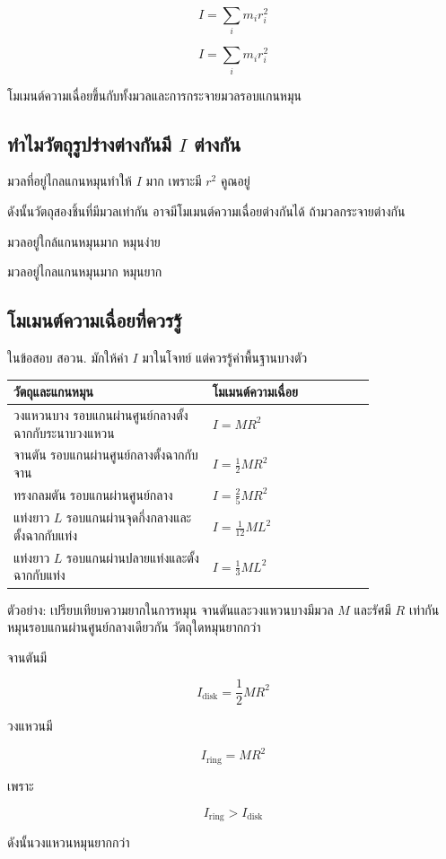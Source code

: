 \[
I=\sum_i m_i r_i^2
\]

\begin{tcolorbox}[title=โมเมนต์ความเฉื่อย]
\[
I=\sum_i m_i r_i^2
\]

โมเมนต์ความเฉื่อยขึ้นกับทั้งมวลและการกระจายมวลรอบแกนหมุน
\end{tcolorbox}

\subsection{ทำไมวัตถุรูปร่างต่างกันมี $I$ ต่างกัน}

มวลที่อยู่ไกลแกนหมุนทำให้ $I$ มาก เพราะมี $r^2$ คูณอยู่

ดังนั้นวัตถุสองชิ้นที่มีมวลเท่ากัน อาจมีโมเมนต์ความเฉื่อยต่างกันได้ ถ้ามวลกระจายต่างกัน

\begin{tcolorbox}[title=ข้อควรจำ]
มวลอยู่ใกล้แกนหมุนมาก หมุนง่าย

มวลอยู่ไกลแกนหมุนมาก หมุนยาก
\end{tcolorbox}

\subsection{โมเมนต์ความเฉื่อยที่ควรรู้}

ในข้อสอบ สอวน. มักให้ค่า $I$ มาในโจทย์ แต่ควรรู้ค่าพื้นฐานบางตัว

\begin{center}
\begin{tabular}{|p{0.44\linewidth}|p{0.36\linewidth}|}
\hline
\textbf{วัตถุและแกนหมุน} & \textbf{โมเมนต์ความเฉื่อย} \\
\hline
วงแหวนบาง รอบแกนผ่านศูนย์กลางตั้งฉากกับระนาบวงแหวน & $I=MR^2$ \\
\hline
จานตัน รอบแกนผ่านศูนย์กลางตั้งฉากกับจาน & $I=\frac{1}{2}MR^2$ \\
\hline
ทรงกลมตัน รอบแกนผ่านศูนย์กลาง & $I=\frac{2}{5}MR^2$ \\
\hline
แท่งยาว $L$ รอบแกนผ่านจุดกึ่งกลางและตั้งฉากกับแท่ง & $I=\frac{1}{12}ML^2$ \\
\hline
แท่งยาว $L$ รอบแกนผ่านปลายแท่งและตั้งฉากกับแท่ง & $I=\frac{1}{3}ML^2$ \\
\hline
\end{tabular}
\end{center}

\begin{examplebox}{ตัวอย่าง: เปรียบเทียบความยากในการหมุน}
จานตันและวงแหวนบางมีมวล $M$ และรัศมี $R$ เท่ากัน หมุนรอบแกนผ่านศูนย์กลางเดียวกัน วัตถุใดหมุนยากกว่า

จานตันมี

\[
I_{\text{disk}}=\frac{1}{2}MR^2
\]

วงแหวนมี

\[
I_{\text{ring}}=MR^2
\]

เพราะ

\[
I_{\text{ring}}>I_{\text{disk}}
\]

ดังนั้นวงแหวนหมุนยากกว่า
\end{examplebox}

